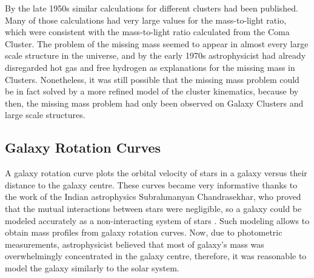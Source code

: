 By the late 1950s similar calculations for different clusters had been published. Many of those calculations had very large values for the mass-to-light ratio\cite{schwarzschildSon}, which were consistent with the mass-to-light ratio calculated from the Coma Cluster. The problem of the missing mass seemed to appear in almost every large scale structure in the universe, and by the early 1970s astrophysicist had already disregarded hot gas\cite{meekins} and free hydrogen\cite{penzias} as explanations for the missing mass in Clusters.
Nonetheless, it was still possible that the missing mass problem could be in fact solved by a more refined model of the cluster kinematics, because by then, the missing mass problem had only been observed on Galaxy Clusters and large scale structures.

\subsection{Galaxy Rotation Curves}
A galaxy rotation curve plots the orbital velocity of stars in a galaxy versus their distance to the galaxy centre.
These curves became very informative thanks to the work of the Indian astrophysics Subrahmanyan Chandrasekhar, who proved that the mutual interactions between stars were negligible, so a galaxy could be modeled accurately as a non-interacting system of stars \cite{chandrasekhar}.
Such modeling allows to obtain mass profiles from galaxy rotation curves.
Now, due to photometric measurements, astrophysicist believed that most of  galaxy's mass was overwhelmingly concentrated in the galaxy centre, therefore, it was reasonable to model the galaxy similarly to the solar system.

